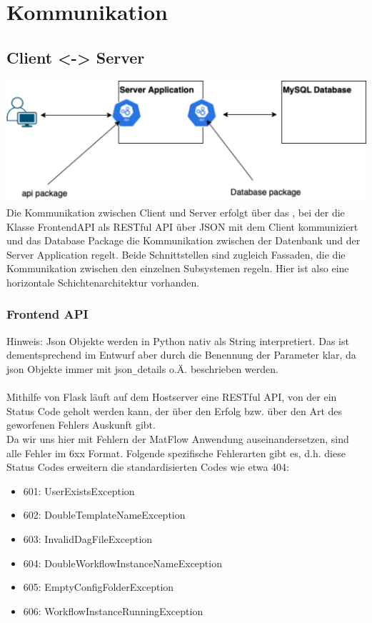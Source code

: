 \section{Kommunikation}

\subsection{Client <-> Server} 
\includegraphics[width=1\textwidth]{res/Kommunikation.png}
Die Kommunikation zwischen Client und Server erfolgt über das , bei der die Klasse FrontendAPI 
als RESTful API über JSON mit dem Client kommuniziert und das Database Package die Kommunikation 
zwischen der Datenbank und der Server Application regelt. Beide Schnittstellen sind zugleich Fassaden, die die Kommunikation
zwischen den einzelnen Subsystemen regeln.
Hier ist also eine horizontale Schichtenarchitektur vorhanden.

\subsubsection{Frontend API}
Hinweis: Json Objekte werden in Python nativ als String interpretiert. Das ist dementsprechend im Entwurf aber durch die 
Benennung der Parameter klar, da json Objekte immer mit json\texttt{\_}details o.Ä. beschrieben werden. \\ \\
Mithilfe von Flask läuft auf dem Hostserver eine RESTful API, von der ein Status Code geholt werden kann, der über den Erfolg 
bzw. über den Art des geworfenen Fehlers Auskunft gibt.\\ 
Da wir uns hier mit Fehlern der MatFlow Anwendung auseinandersetzen, sind alle Fehler im 6xx Format.
Folgende spezifische Fehlerarten gibt es, d.h. diese Status Codes erweitern die standardisierten Codes wie etwa 404:
\begin{itemize}
    \item 601: UserExistsException
    \item 602: DoubleTemplateNameException
    \item 603: InvalidDagFileException
    \item 604: DoubleWorkflowInstanceNameException
    \item 605: EmptyConfigFolderException
    \item 606: WorkflowInstanceRunningException
\end{itemize}

